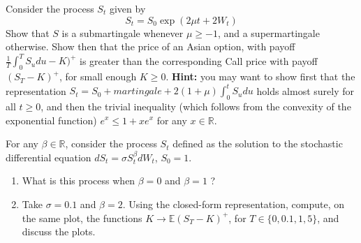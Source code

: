 \documentclass[12pt,a4paper]{exam}
\begin{document}
\begin{questions}
\question Consider the process $S_t$ given by
\begin{equation*}
S_t = S_0\exp(2\mu t + 2W_t)
\end{equation*}
Show that $S$ is a submartingale whenever $\mu\geq -1$, and a supermartingale otherwise. Show then that the price of an Asian option, with payoff $\frac{1}{T}\int_0^T S_u du - K)^+$ is greater than the corresponding Call price with payoff $(S_T-K)^+$, for small enough $K\geq 0$.
\textbf{Hint:} you may want to show first that the representation $S_t = S_0 + martingale + 2(1 + \mu)\int_0^t S_u du$  holds almost surely for all $t \geq 0$, and then the trivial inequality (which follows from the convexity of the exponential function) $e^x \leq 1 + xe^x$ for any $x \in\mathbb{R}$.
\fillwithlines{3cm}

\begin{solution}
\end{solution}

\question For any $\beta\in\mathbb{R}$, consider the process $S_t$ defined as the solution to the stochastic differential equation $dS_t = \sigma S^\beta_t dW_t$, $S_0 = 1$.
\begin{enumerate}[label=(\alph*),font=\itshape]
\item What is this process when $\beta=0$ and $\beta = 1$ ?
\item Take $\sigma = 0.1$ and $\beta = 2$. Using the closed-form representation, compute, on the same plot, the functions $K\rightarrow \mathbb{E}(S_T - K)^+$, for $T\in\{0, 0.1, 1, 5\}$, and discuss the plots.
\end{enumerate}
\fillwithlines{3cm}


\end{questions}
\end{document}
